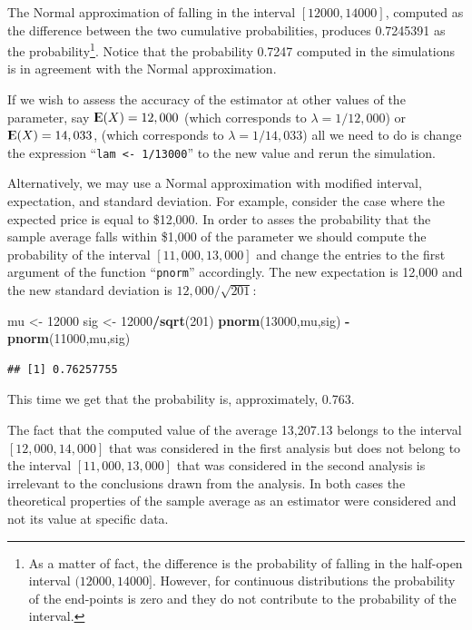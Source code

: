 \documentclass[]{krantz}
\makeatletter
\newenvironment{Shaded}{\begin{snugshade}}{\end{snugshade}}
\newcommand{\DecValTok}[1]{\textcolor[rgb]{0.00,0.00,0.81}{#1}}
\newcommand{\KeywordTok}[1]{\textcolor[rgb]{0.13,0.29,0.53}{\textbf{#1}}}
\newcommand{\NormalTok}[1]{#1}
\newcommand{\OperatorTok}[1]{\textcolor[rgb]{0.81,0.36,0.00}{\textbf{#1}}}
\newcommand{\StringTok}[1]{\textcolor[rgb]{0.31,0.60,0.02}{#1}}
\newcommand{\Expec}{{\rm I\kern-.3em E}}
\newenvironment{kframe}{%
\medskip{}
\setlength{\fboxsep}{.8em}
 \def\at@end@of@kframe{}%
 \ifinner\ifhmode%
  \def\at@end@of@kframe{\end{minipage}}%
  \begin{minipage}{\columnwidth}%
 \fi\fi%
 \def\FrameCommand##1{\hskip\@totalleftmargin \hskip-\fboxsep
 \colorbox{shadecolor}{##1}\hskip-\fboxsep
     \hskip-\linewidth \hskip-\@totalleftmargin \hskip\columnwidth}%
 \MakeFramed {\advance\hsize-\width
   \@totalleftmargin\z@ \linewidth\hsize
   \@setminipage}}%
 {\par\unskip\endMakeFramed%
 \at@end@of@kframe}
\renewenvironment{Shaded}{\begin{kframe}}{\end{kframe}}
\theoremstyle{definition}
\theoremstyle{definition}
\theoremstyle{definition}
\theoremstyle{remark}
\makeatother
\begin{document}
The Normal approximation of falling in the interval \([12000, 14000]\),
computed as the difference between the two cumulative probabilities,
produces 0.7245391 as the probability\footnote{As a matter of fact, the difference is the probability of falling
  in the half-open interval \((12000,14000]\). However, for continuous
  distributions the probability of the end-points is zero and they do
  not contribute to the probability of the interval.}. Notice that the probability
0.7247 computed in the simulations is in agreement with the Normal
approximation.

If we wish to assess the accuracy of the estimator at other values of
the parameter, say \(\Expec(X) = 12,000\) (which corresponds to
\(\lambda = 1/12,000\)) or \(\Expec(X) = 14,033\), (which corresponds to
\(\lambda = 1/14,033\)) all we need to do is change the expression
``\texttt{lam\ \textless{}-\ 1/13000}'' to the new value and rerun the simulation.

Alternatively, we may use a Normal approximation with modified interval,
expectation, and standard deviation. For example, consider the case
where the expected price is equal to \$12,000. In order to asses the
probability that the sample average falls within \$1,000 of the
parameter we should compute the probability of the interval
\([11,000, 13,000]\) and change the entries to the first argument of the
function ``\texttt{pnorm}'' accordingly. The new expectation is 12,000 and the
new standard deviation is \(12,000/\sqrt{201}\):

\begin{Shaded}
\begin{Highlighting}[]
\NormalTok{mu <-}\StringTok{ }\DecValTok{12000}
\NormalTok{sig <-}\StringTok{ }\DecValTok{12000}\OperatorTok{/}\KeywordTok{sqrt}\NormalTok{(}\DecValTok{201}\NormalTok{)}
\KeywordTok{pnorm}\NormalTok{(}\DecValTok{13000}\NormalTok{,mu,sig) }\OperatorTok{-}\StringTok{ }\KeywordTok{pnorm}\NormalTok{(}\DecValTok{11000}\NormalTok{,mu,sig)}
\end{Highlighting}
\end{Shaded}

\begin{verbatim}
## [1] 0.76257755
\end{verbatim}

This time we get that the probability is, approximately, 0.763.

The fact that the computed value of the average 13,207.13 belongs to the
interval \([12,000, 14,000]\) that was considered in the first analysis
but does not belong to the interval \([11,000, 13,000]\) that was
considered in the second analysis is irrelevant to the conclusions drawn
from the analysis. In both cases the theoretical properties of the
sample average as an estimator were considered and not its value at
specific data.
\end{document}
